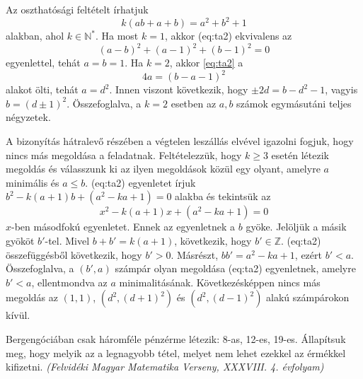 \begin{solution}
Az oszthatósági feltételt írhatjuk 
\begin{equation}
k(ab+a+b)=a^{2}+b^{2}+1\label{eq:ta2}
\end{equation}
alakban, ahol $k\in\mathbb{N}^{*}.$ Ha most $k=1$, akkor \aref({eq:ta2})
ekvivalens az 
\[
(a-b)^{2}+(a-1)^{2}+(b-1)^{2}=0
\]
egyenlettel, tehát $a=b=1.$ Ha $k=2$, akkor \eqref{eq:ta2} a 
\[
4a=(b-a-1)^{2}
\]
alakot ölti, tehát $a=d^{2}$. Innen viszont következik, hogy $\pm2d=b-d^{2}-1$,
vagyis $b=(d\pm1)^{2}$. Összefoglalva, a $k=2$ esetben az $a,b$
számok egymásutáni teljes négyzetek.

A bizonyítás hátralevő részében a végtelen leszállás elvével igazolni
fogjuk, hogy nincs más megoldása a feladatnak. Feltételezzük, hogy
$k\ge3$ esetén létezik megoldás és válasszunk ki az ilyen megoldások
közül egy olyant, amelyre $a$ minimális és $a\le b.$ \Aref({eq:ta2})
egyenletet írjuk $b^{2}-k(a+1)b+(a^{2}-ka+1)=0$ alakba és tekintsük
az 
\[
x^{2}-k(a+1)x+(a^{2}-ka+1)=0
\]
$x$-ben másodfokú egyenletet. Ennek az egyenletnek a $b$ gyöke.
Jelöljük a másik gyököt $b'$-tel. Mivel $b+b'=k(a+1)$, következik,
hogy $b'\in\mathbb{Z}$. \Aref({eq:ta2}) összefüggésből következik,
hogy $b'>0$. Másrészt, $bb'=a^{2}-ka+1$, ezért $b'<a$. Összefoglalva,
a $(b',a)$ számpár olyan megoldása \aref({eq:ta2}) egyenletnek,
amelyre $b'<a$, ellentmondva az $a$ minimalitásának. Következésképpen
nincs más megoldás az $(1,1)$, $(d^{2},(d+1)^{2})$ és $(d^{2},(d-1)^{2})$
alakú számpárokon kívül. 
\end{solution}
\begin{extraproblem}
Bergengóciában csak háromféle pénzérme létezik: 8-as, 12-es, 19-es.
Állapítsuk meg, hogy melyik az a legnagyobb tétel, melyet nem lehet
ezekkel az érmékkel kifizetni. \emph{(Felvidéki Magyar Matematika
Verseny, XXXVIII. 4. évfolyam) }
\end{extraproblem}

